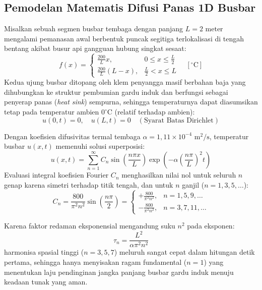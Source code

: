\documentclass[11pt,a4paper]{article}
\theoremstyle{definition}
\begin{document}
\subsection{Pemodelan Matematis Difusi Panas 1D Busbar}
Misalkan sebuah segmen busbar tembaga dengan panjang $L = 2\text{ meter}$ mengalami pemanasan awal berbentuk puncak segitiga terlokalisasi di tengah bentang akibat busur api gangguan hubung singkat sesaat:
\begin{equation}
    f(x) = \begin{cases} \frac{200}{L} x, & 0 \le x \le \frac{L}{2} \\ \frac{200}{L}(L - x), & \frac{L}{2} < x \le L \end{cases} \quad [^\circ\text{C}]
\end{equation}
Kedua ujung busbar ditopang oleh klem penyangga masif berbahan baja yang dihubungkan ke struktur pembumian gardu induk dan berfungsi sebagai penyerap panas (\textit{heat sink}) sempurna, sehingga temperaturnya dapat diasumsikan tetap pada temperatur ambien $0^\circ\text{C}$ (relatif terhadap ambien):
\begin{equation}
    u(0, t) = 0, \quad u(L, t) = 0 \quad (\text{Syarat Batas Dirichlet})
\end{equation}

Dengan koefisien difusivitas termal tembaga $\alpha = 1{,}11 \times 10^{-4}\text{ m}^2/\text{s}$, temperatur busbar $u(x, t)$ memenuhi solusi superposisi:
\begin{equation}
    u(x, t) = \sum_{n=1}^{\infty} C_n \sin\left(\frac{n\pi x}{L}\right) \exp\left( -\alpha \left(\frac{n\pi}{L}\right)^2 t \right)
\end{equation}
Evaluasi integral koefisien Fourier $C_n$ menghasilkan nilai nol untuk seluruh $n$ genap karena simetri terhadap titik tengah, dan untuk $n$ ganjil ($n = 1, 3, 5, \dots$):
\begin{equation}
    C_n = \frac{800}{\pi^2 n^2} \sin\left(\frac{n\pi}{2}\right) = \begin{cases} +\frac{800}{\pi^2 n^2}, & n = 1, 5, 9, \dots \\ -\frac{800}{\pi^2 n^2}, & n = 3, 7, 11, \dots \end{cases}
\end{equation}

Karena faktor redaman eksponensial mengandung suku $n^2$ pada eksponen:
\begin{equation}
    \tau_n = \frac{L^2}{\alpha \pi^2 n^2}
\end{equation}
harmonisa spasial tinggi ($n = 3, 5, 7$) meluruh sangat cepat dalam hitungan detik pertama, sehingga hanya menyisakan ragam fundamental ($n = 1$) yang menentukan laju pendinginan jangka panjang busbar gardu induk menuju keadaan tunak yang aman.
\end{document}
